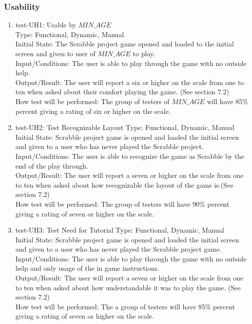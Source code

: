 \documentclass[12pt, titlepage]{article}
\begin{document}
\subsubsection{Usability}
\begin{enumerate}
    \item{test-UH1: Usable by $MIN\_AGE$\\}
    Type: Functional, Dynamic, Manual\\
    Initial State: The Scrabble project game opened and loaded to the initial screen and given to user of $MIN\_AGE$ to play.\\
    Input/Conditions: The user is able to play through the game with no outside help.\\
    Output/Result:  The user will report a six or higher on the scale from one to ten when asked about their comfort playing the game. (See section 7.2)\\
    How test will be performed: The group of testers of $MIN\_AGE$ will have 85\% percent giving a rating of six or higher on the scale.\\
    
    \item{test-UH2: Test Recognizable Layout}
    Type: Functional, Dynamic, Manual\\
    Initial State: Scrabble project game is opened and loaded the initial screen and given to a user who has never played the Scrabble project.\\
    Input/Conditions: The user is able to recognize the game as Scrabble by the end of the play through.\\
    Output/Result:  The user will report a seven or higher on the scale from one to ten when asked about how recognizable the layout of the game is.(See section 7.2)\\
    How test will be performed: The group of testers will have 90\% percent giving a rating of seven or higher on the scale.\\
    
    \item{test-UH3: Test Need for Tutorial}
    Type: Functional, Dynamic, Manual\\
    Initial State: Scrabble project game is opened and loaded the initial screen and given to a user who has never played the Scrabble project game.\\
    Input/Conditions: The user is able to play through the game with no outside help and only usage of the in game instructions.\\
    Output/Result:  The user will report a seven or higher on the scale from one to ten when asked about how understandable it was to play the game. (See section 7.2)\\
    How test will be performed: The a group of testers will have 85\% percent giving a rating of seven or higher on the scale.\\
    

\end{enumerate}
\end{document}
